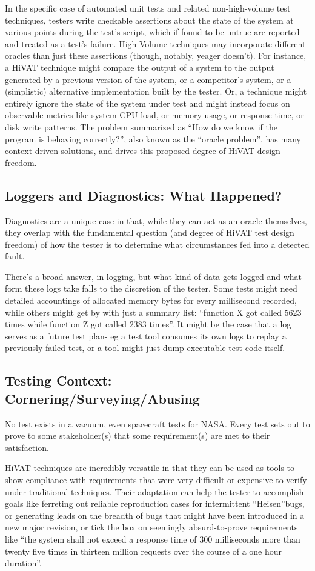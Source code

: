 In the specific case of automated unit tests and related non-high-volume test techniques, testers write checkable assertions about the state of the system at various points during the test's script, which if found to be untrue are reported and treated as a test's failure. High Volume techniques may incorporate different oracles than just these assertions (though, notably, yeager doesn't). For instance, a HiVAT technique might compare the output of a system to the output generated by a previous version of the system, or a competitor's system, or a (simplistic) alternative implementation built by the tester. Or, a technique might entirely ignore the state of the system under test and might instead focus on observable metrics like system CPU load, or memory usage, or response time, or disk write patterns. The problem summarized as ``How do we know if the program is behaving correctly?'', also known as the ``oracle problem'', has many context-driven solutions, and drives this proposed degree of HiVAT design freedom.

\subsection{Loggers and Diagnostics: What Happened?}
Diagnostics are a unique case in that, while they can act as an oracle themselves, they overlap with the fundamental question (and degree of HiVAT test design freedom) of how the tester is to determine what circumstances fed into a detected fault.

There's a broad answer, in logging, but what kind of data gets logged and what form these logs take falls to the discretion of the tester. Some tests might need detailed accountings of allocated memory bytes for every millisecond recorded, while others might get by with just a summary list: ``function X got called 5623 times while function Z got called 2383 times''. It might be the case that a log serves as a future test plan- eg a test tool consumes its own logs to replay a previously failed test, or a tool might just dump executable test code itself.

\subsection{Testing Context: Cornering/Surveying/Abusing}
No test exists in a vacuum, even spacecraft tests for NASA. Every test sets out to prove to some stakeholder(s) that some requirement(s) are met to their satisfaction.

HiVAT techniques are incredibly versatile in that they can be used as tools to show compliance with requirements that were very difficult or expensive to verify under traditional techniques. Their adaptation can help the tester to accomplish goals like ferreting out reliable reproduction cases for intermittent ``Heisen''bugs, or generating leads on the breadth of bugs that might have been introduced in a new major revision, or tick the box on seemingly absurd-to-prove requirements like ``the system shall not exceed a response time of 300 milliseconds more than twenty five times in thirteen million requests over the course of a one hour duration''.

